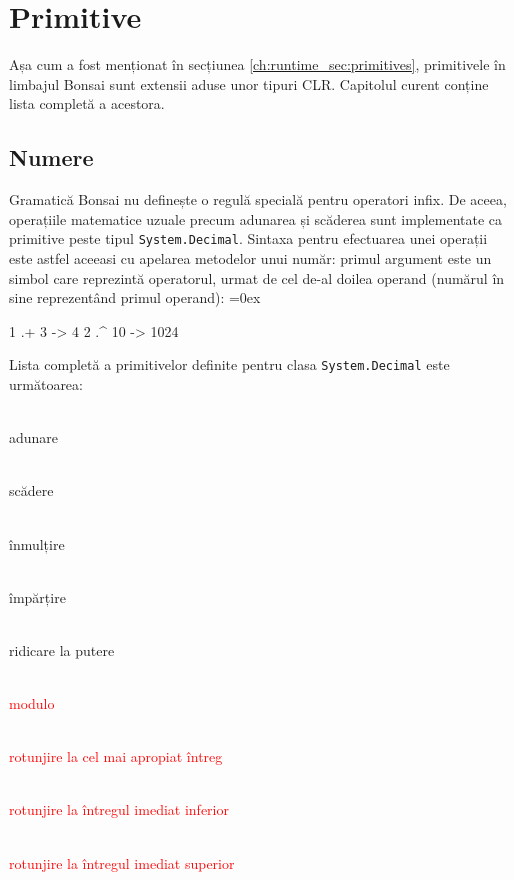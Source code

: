 \documentclass[12pt,a4paper]{memoir}
\newcommand{\draft}{\textcolor{red}}
\renewcommand{\c}{\texttt}
\newenvironment{code}
{
\definecolor{shadecolor}{gray}{0.91}
\topsep=0ex
\relax
\shaded
\verbatim
}
{
\endverbatim
\endshaded
}
\begin{document}
\chapter{Primitive}\label{ch:Primitives}

Așa cum a fost menționat în secțiunea \ref{ch:runtime_sec:primitives}, primitivele în limbajul Bonsai sunt extensii aduse unor tipuri CLR. Capitolul curent conține lista completă a acestora.

\section{Numere}

Gramatică Bonsai nu definește o regulă specială pentru operatori infix. De aceea, operațiile matematice uzuale precum adunarea și scăderea sunt implementate ca primitive peste tipul \c{System.Decimal}. Sintaxa pentru efectuarea unei operații este astfel aceeasi cu apelarea metodelor unui număr: primul argument este un simbol care reprezintă operatorul, urmat de cel de-al doilea operand (numărul în sine reprezentând primul operand):
\begin{code}
1 .+ 3 
  -> 4
2 .^ 10
  -> 1024
\end{code}

Lista completă a primitivelor definite pentru clasa \c{System.Decimal} este următoarea:

\begin{description}
\item[\c{.+}]\hfill\\ adunare
\item[\c{.-}]\hfill\\ scădere
\item[\c{.*}]\hfill\\ înmulțire
\item[\c{./}]\hfill\\ împărțire
\item[\c{.\textasciicircum}]\hfill\\ ridicare la putere
\draft{
\item[\c{.\%}]\hfill\\ modulo
\item[\c{.round}]\hfill\\ rotunjire la cel mai apropiat întreg
\item[\c{.floor}]\hfill\\ rotunjire la întregul imediat inferior
\item[\c{.ceiling}]\hfill\\ rotunjire la întregul imediat superior
}
\end{description}
\end{document}

